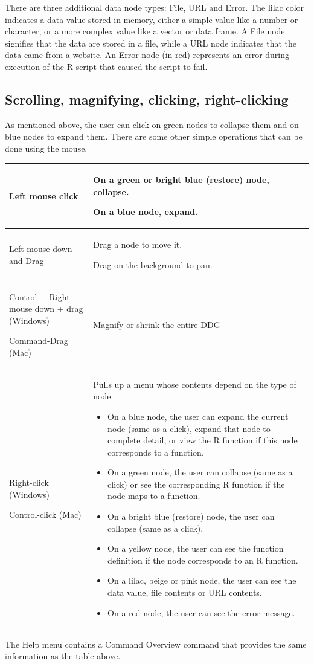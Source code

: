 \documentclass[12pt]{article}
\newcommand\liststyleWWviiiNumiii{%
\renewcommand\labelitemi{•}
\renewcommand\labelitemii{•}
\renewcommand\labelitemiii{•}
\renewcommand\labelitemiv{•}
}
\begin{document}
{{\mdseries\upshape\color{black}
There are three additional data node types: File, URL and Error. The lilac color indicates a data value stored in memory, either a simple value like a number or character, or a more complex value like a vector or data frame. A File node signifies that the data are stored in a file, while a URL node indicates that the data came from a website. An Error node (in red) represents an error during execution of the R script that caused the script to fail.}
\subsection{Scrolling, magnifying, clicking, right-clicking}

{\mdseries\upshape\color{black}
As mentioned above, the user can click on green nodes to collapse them and on blue nodes to expand them. There are some other simple operations that can be done using the mouse.}

\begin{flushleft}
\tablefirsthead{}
\tablehead{}
\tabletail{}
\tablelasttail{}
\begin{supertabular}{|m{2.0in}|m{4.3in}|}
\hline
Left mouse click &
On a green or bright blue (restore) node, collapse.

On a blue node, expand.\\
\hline
Left mouse down and Drag &
Drag a node to move it.

Drag on the background to pan.\\
\hline
Control + Right mouse down + drag (Windows)

Command-Drag (Mac) &
Magnify or shrink the entire DDG\\
\hline
Right-click (Windows)

Control-click (Mac) &
Pulls up a menu whose contents depend on the type of node.

\liststyleWWviiiNumiii
\begin{itemize}
\item On a blue node, the user can expand the current node (same as a click), expand that node to complete detail, or view the R function if this node corresponds to a function.
\item On a green node, the user can collapse (same as a click) or see the corresponding R function if the node maps to a function.
\item On a bright blue (restore) node, the user can collapse (same as a click).
\item On a yellow node, the user can see the function definition if the node corresponds to an R function.
\item On a lilac, beige or pink node, the user can see the data value, file contents or URL contents.
\item On a red node, the user can see the error message.
\end{itemize}
\\ \hline
\end{supertabular}
\end{flushleft}
{\mdseries\upshape\color{black}
The Help menu contains a Command Overview command that provides the same information as the table above.}

}
\end{document}
